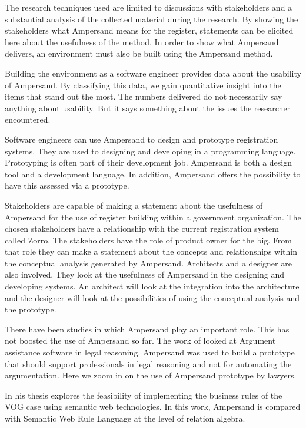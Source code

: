 The research techniques used are limited to discussions with stakeholders and a substantial analysis of the collected material during the research.
By showing the stakeholders what Ampersand means for the register, statements can be elicited here about the usefulness of the method.
In order to show what Ampersand delivers, an environment must also be built using the Ampersand method.

%
Building the environment as a software engineer provides data about the usability of Ampersand.
By classifying this data, we gain quantitative insight into the items that stand out the most.
The numbers delivered do not necessarily say anything about usability.
But it says something about the issues the researcher encountered.

Software engineers can use Ampersand to design and prototype registration systems.
They are used to designing and developing in a programming language.
Prototyping is often part of their development job.
Ampersand is both a design tool and a development language.
In addition, Ampersand offers the possibility to have this assessed via a prototype.

Stakeholders are capable of making a statement about the usefulness of Ampersand for the use of register building within a government organization.
The chosen stakeholders have a relationship with the current registration system called Zorro.
The stakeholders have the role of product owner for the \acrlong{big}.
From that role they can make a statement about the concepts and relationships within the conceptual analysis generated by Ampersand.
Architects and a designer are also involved.
They look at the usefulness of Ampersand in the designing and developing systems.
An architect will look at the integration into the architecture and the designer will look at the possibilities of using the conceptual analysis and the prototype.

There have been studies in which Ampersand play an important role.
This has not boosted the use of Ampersand so far.
The work of  looked at Argument assistance software in legal reasoning.
Ampersand was used to build a prototype that should support professionals in legal reasoning and not for automating the argumentation.
Here we zoom in on the use of Ampersand prototype by lawyers.

In his thesis  explores \citeauthor{bos_pim_bedrijfsregels_2013} the feasibility of implementing the business rules of the VOG case using semantic web technologies.
In this work, Ampersand is compared with Semantic Web Rule Language at the level of relation algebra.



